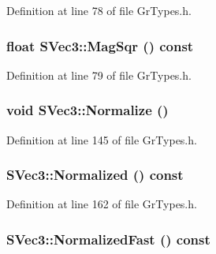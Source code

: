 Definition at line 78 of file GrTypes.h.\hypertarget{struct_s_vec3_721348baa5a216e3784241336baa34f4}{
\subsubsection[{MagSqr}]{\setlength{\rightskip}{0pt plus 5cm}float SVec3::MagSqr () const}}
\label{struct_s_vec3_721348baa5a216e3784241336baa34f4}




Definition at line 79 of file GrTypes.h.\hypertarget{struct_s_vec3_5b3afb295582e6c100e8a8ac931d1793}{
\subsubsection[{Normalize}]{\setlength{\rightskip}{0pt plus 5cm}void SVec3::Normalize ()}}
\label{struct_s_vec3_5b3afb295582e6c100e8a8ac931d1793}




Definition at line 145 of file GrTypes.h.\hypertarget{struct_s_vec3_cfb19f8729abb5eade96512a5153df07}{
\subsubsection[{Normalized}]{ SVec3::Normalized () const}}
\label{struct_s_vec3_cfb19f8729abb5eade96512a5153df07}




Definition at line 162 of file GrTypes.h.\hypertarget{struct_s_vec3_c7d0f668fc1d020f23c83df477e33ca2}{
\subsubsection[{NormalizedFast}]{ SVec3::NormalizedFast () const}}
\label{struct_s_vec3_c7d0f668fc1d020f23c83df477e33ca2}




